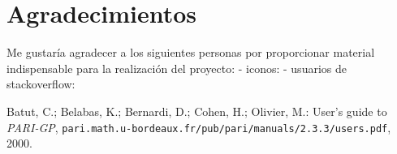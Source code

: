 \documentclass[12pt,a4paper,openright,oneside]{article}
\numberwithin{equation}{section}
\theoremstyle{definition}
\begin{document}
\section*{Agradecimientos}
Me gustaría agradecer a los siguientes personas por proporcionar material indispensable para la realización del proyecto:
- iconos: %
- usuarios de stackoverflow:
\newpage


\begin{thebibliography}{25}
 Batut, C.; Belabas, K.; Bernardi, D.; Cohen, H.; Olivier, M.: User's guide to \textit{PARI-GP},  \newline \texttt{pari.math.u-bordeaux.fr/pub/pari/manuals/2.3.3/users.pdf}, 2000.
\end{thebibliography}
\end{document}
